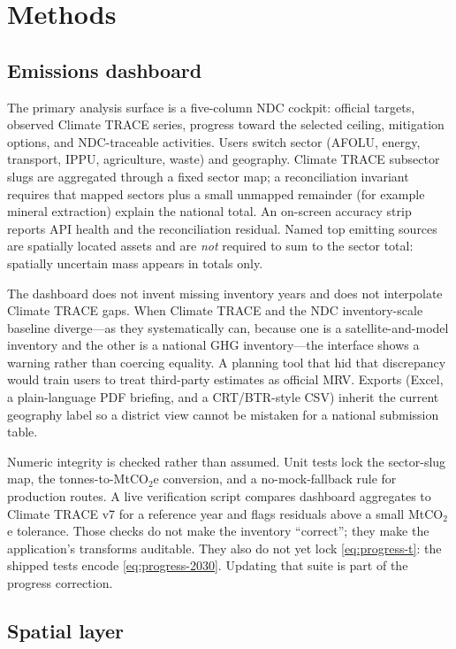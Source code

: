 \documentclass{article}
\begin{document}
\section{Methods}
\label{sec:methods}

\subsection{Emissions dashboard}
\label{sec:dashboard}

The primary analysis surface is a five-column NDC cockpit: official targets, observed Climate TRACE series, progress toward the selected ceiling, mitigation options, and NDC-traceable activities. Users switch sector (AFOLU, energy, transport, IPPU, agriculture, waste) and geography. Climate TRACE subsector slugs are aggregated through a fixed sector map; a reconciliation invariant requires that mapped sectors plus a small unmapped remainder (for example mineral extraction) explain the national total. An on-screen accuracy strip reports API health and the reconciliation residual. Named top emitting sources are spatially located assets and are \emph{not} required to sum to the sector total: spatially uncertain mass appears in totals only.

The dashboard does not invent missing inventory years and does not interpolate Climate TRACE gaps. When Climate TRACE and the NDC inventory-scale baseline diverge---as they systematically can, because one is a satellite-and-model inventory and the other is a national GHG inventory---the interface shows a warning rather than coercing equality. A planning tool that hid that discrepancy would train users to treat third-party estimates as official MRV. Exports (Excel, a plain-language PDF briefing, and a CRT/BTR-style CSV) inherit the current geography label so a district view cannot be mistaken for a national submission table.

Numeric integrity is checked rather than assumed. Unit tests lock the sector-slug map, the tonnes-to-MtCO$_2$e conversion, and a no-mock-fallback rule for production routes. A live verification script compares dashboard aggregates to Climate TRACE v7 for a reference year and flags residuals above a small MtCO$_2$e tolerance. Those checks do not make the inventory ``correct''; they make the application's transforms auditable. They also do not yet lock \eqref{eq:progress-t}: the shipped tests encode \eqref{eq:progress-2030}. Updating that suite is part of the progress correction.

\subsection{Spatial layer}
\label{sec:map}
\end{document}
